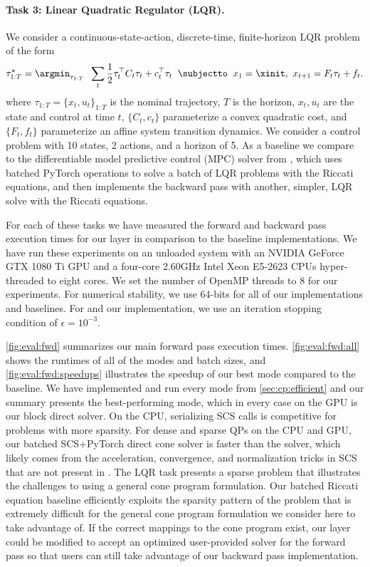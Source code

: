 \paragraph{Task 3: Linear Quadratic Regulator (LQR).}
We consider a continuous-state-action, discrete-time, finite-horizon
LQR problem of the form
\begin{equation}
  \label{eq:cvxpyth:lqr}
  \tau^{\star}_{1:T} = \argmin_{\tau_{1:T}}\;\;
  \sum_{t} \frac{1}{2} \tau_t^\top  C_t \tau_t + c_t^\top  \tau_t \;\;
  \subjectto\;\;
  x_1 = \xinit,\
  x_{t+1} = F_t\tau_t + f_t.
\end{equation}
where $\tau_{1:T} = \{x_t, u_t\}_{1:T}$ is the nominal trajectory,
$T$ is the horizon,
$x_t, u_t$ are the state and control at time $t$,
$\{C_t, c_t\}$ parameterize a convex quadratic cost,
and $\{F_t, f_t\}$ parameterize an affine system
transition dynamics.
We consider a control problem with 10 states,
2 actions, and a horizon of 5.
As a baseline we compare to the differentiable model
predictive control (MPC) solver from
\citep{amos2018differentiable}, which uses batched
PyTorch operations to solve a batch of LQR problems with
the Riccati equations, and then implements the backward
pass with another, simpler, LQR solve with
the Riccati equations.

For each of these tasks we have measured the forward
and backward pass execution times for our layer in
comparison to the baseline implementations.
We have run these experiments on an unloaded system with
an NVIDIA GeForce GTX 1080 Ti GPU and
a four-core 2.60GHz Intel Xeon E5-2623 CPUs hyper-threaded
to eight cores.
We set the number of OpenMP threads to 8 for our experiments.
For numerical stability, we use 64-bits for all of
our implementations and baselines.
For \qpth and our implementation, we use an iteration
stopping condition of $\epsilon=10^{-3}$.

\cref{fig:eval:fwd} summarizes our main forward pass execution
times. \cref{fig:eval:fwd:all} shows the runtimes of all of the
modes and batch sizes, and \cref{fig:eval:fwd:speedups}
illustrates the speedup of our best mode compared to the baseline.
We have implemented and run every mode from \cref{sec:cp:efficient}
and our summary presents the best-performing mode,
which in every case on the GPU is our block direct solver.
On the CPU, serializing SCS calls is competitive for
problems with more sparsity.
For dense and sparse QPs on the CPU and GPU, our batched
SCS+PyTorch direct cone solver is faster than
the \qpth solver, which likely comes from the
acceleration, convergence, and normalization
tricks in SCS that are not present in \qpth.
The LQR task presents a sparse problem that illustrates
the challenges to using a general cone program formulation.
Our batched Riccati equation baseline efficiently exploits
the sparsity pattern of the problem that is extremely
difficult for the general cone program formulation we
consider here to take advantage of.
If the correct mappings to the cone program exist,
our layer could be modified to accept an
optimized user-provided solver for the forward pass
so that users can still take advantage of our backward
pass implementation.


